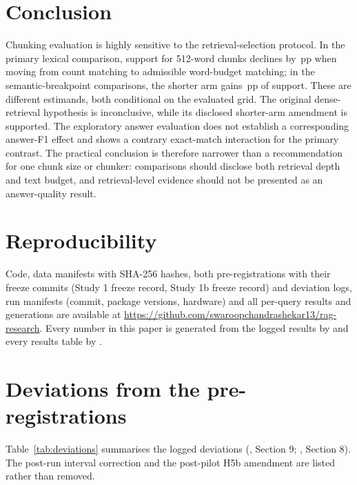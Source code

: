 \documentclass[11pt]{article}
\newcommand{\pp}{\ensuremath{\,\mathrm{pp}}}
\begin{document}
\section{Conclusion}
Chunking evaluation is highly sensitive to the retrieval-selection protocol. In the primary lexical comparison,
support for 512-word chunks declines by \HOneEst\pp{} when moving from count matching to admissible word-budget
matching; in the semantic-breakpoint comparisons, the shorter arm gains \HFourEst\pp{} of support. These are different
estimands, both conditional on the evaluated grid. The original dense-retrieval hypothesis is inconclusive, while its
disclosed shorter-arm amendment is supported. The exploratory answer evaluation does not establish a corresponding
answer-F1 effect and shows a contrary exact-match interaction for the primary contrast. The practical conclusion is
therefore narrower than a recommendation for one chunk size or chunker: comparisons should disclose both retrieval
depth and text budget, and retrieval-level evidence should not be presented as an answer-quality result.

\section{Reproducibility}\label{sec:reproducibility}
Code, data manifests with SHA-256 hashes, both pre-registrations with their freeze commits (Study 1 freeze record,
Study 1b freeze record) and deviation logs, run manifests (commit, package versions, hardware) and all per-query results and
generations are available at \url{https://github.com/swaroopchandrashekar13/rag-research}. Every number in this paper is generated from the
logged results by  and every results table by .





\clearpage
\appendix
\section{Deviations from the pre-registrations}\label{app:deviations}
Table~\ref{tab:deviations} summarises the logged deviations (, Section 9;
, Section 8). The post-run interval correction and the post-pilot H5b
amendment are listed rather than removed.
\end{document}
